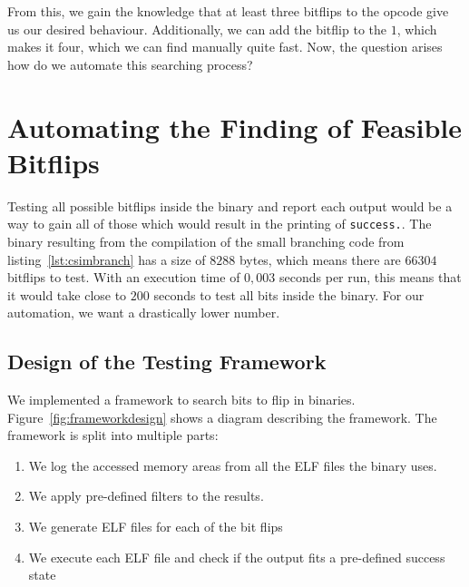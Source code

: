 From this, we gain the knowledge that at least three bitflips to the opcode give
us our desired behaviour. Additionally, we can add the bitflip to the $1$, which
makes it four, which we can find manually quite fast. Now, the question arises
how do we automate this searching process?

\section{Automating the Finding of Feasible Bitflips}

Testing all possible bitflips inside the binary and report each output would be
a way to gain all of those which would result in the printing of
\texttt{success.}. The binary resulting from the compilation of the small
branching code from listing~\ref{lst:csimbranch} has a size of $8288$ bytes,
which means there are $66304$ bitflips to test. With an execution time of
$0,003$ seconds per run, this means that it would take close to $200$ seconds to
test all bits inside the binary. For our automation, we want a drastically lower
number.

\subsection{Design of the Testing Framework}

We implemented a framework to search bits to flip in binaries.
Figure~\ref{fig:frameworkdesign} shows a diagram describing the framework. The
framework is split into multiple parts:

\begin{enumerate}
\item We log the accessed memory areas from all the ELF files the binary uses.
\item We apply pre-defined filters to the results.
\item We generate ELF files for each of the bit flips
\item We execute each ELF file and check if the output fits a pre-defined
success state
\end{enumerate}

